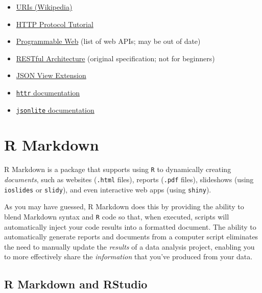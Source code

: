 \documentclass[]{book}
\providecommand{\tightlist}{%
  \setlength{\itemsep}{0pt}\setlength{\parskip}{0pt}}
\theoremstyle{definition}
\theoremstyle{definition}
\theoremstyle{remark}
\begin{document}
\begin{itemize}
\tightlist
\item
  \href{https://en.wikipedia.org/wiki/Uniform_Resource_Identifier}{URIs
  (Wikipedia)}
\item
  \href{https://code.tutsplus.com/tutorials/http-the-protocol-every-web-developer-must-know-part-1--net-31177}{HTTP
  Protocol Tutorial}
\item
  \href{http://www.programmableweb.com/}{Programmable Web} (list of web
  APIs; may be out of date)
\item
  \href{https://www.ics.uci.edu/~fielding/pubs/dissertation/rest_arch_style.htm}{RESTful
  Architecture} (original specification; not for beginners)
\item
  \href{https://chrome.google.com/webstore/detail/jsonview/chklaanhfefbnpoihckbnefhakgolnmc?hl=en}{JSON
  View Extension}
\item
  \href{https://cran.r-project.org/web/packages/httr/vignettes/quickstart.html}{\texttt{httr}
  documentation}
\item
  \href{https://cran.r-project.org/web/packages/jsonlite/jsonlite.pdf}{\texttt{jsonlite}
  documentation}
\end{itemize}

\chapter{R Markdown}\label{r-markdown}

R Markdown is a package that supports using \texttt{R} to dynamically
creating \emph{documents}, such as websites (\texttt{.html} files),
reports (\texttt{.pdf} files), slideshows (using \texttt{ioslides} or
\texttt{slidy}), and even interactive web apps (using \texttt{shiny}).

As you may have guessed, R Markdown does this by providing the ability
to blend Markdown syntax and \texttt{R} code so that, when executed,
scripts will automatically inject your code results into a formatted
document. The ability to automatically generate reports and documents
from a computer script eliminates the need to manually update the
\emph{results} of a data analysis project, enabling you to more
effectively share the \emph{information} that you've produced from your
data.

\section{R Markdown and RStudio}\label{r-markdown-and-rstudio}
\end{document}

